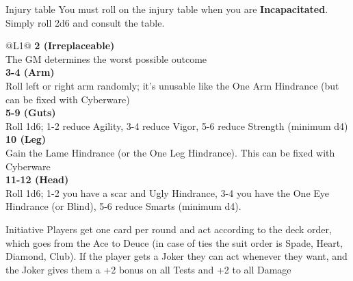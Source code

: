 \begin{genericsection}{Injury table}
You must roll on the injury table when you are \textbf{Incapacitated}. Simply roll 2d6 and consult the table.
\begin{redtable}{\linewidth}{@{}L{1}@{}}
  \textbf{2 (Irreplaceable)}\\
  The GM determines the worst possible outcome\\
  \textbf{3-4 (Arm)}\\
  Roll left or right arm randomly; it’s unusable like the One Arm Hindrance (but can be fixed with Cyberware)\\
  \textbf{5-9 (Guts)}\\
  Roll 1d6; 1-2 reduce Agility, 3-4 reduce Vigor, 5-6 reduce Strength (minimum d4)\\
  \textbf{10 (Leg)}\\
  Gain the Lame Hindrance (or the One Leg Hindrance). This can be fixed with Cyberware\\
  \textbf{11-12 (Head)}\\
  Roll 1d6; 1-2 you have a scar and Ugly Hindrance, 3-4 you have the One Eye Hindrance (or Blind), 5-6 reduce Smarts (minimum d4).
\end{redtable}
\end{genericsection}

\begin{genericsection}{Initiative}
Players get one card per round and act according to the deck order, which goes from the Ace to Deuce (in case of ties the suit order is Spade, Heart, Diamond, Club). If the player gets a Joker they can act whenever they want, and the Joker gives them a +2 bonus on all Tests and +2 to all Damage
\end{genericsection}

